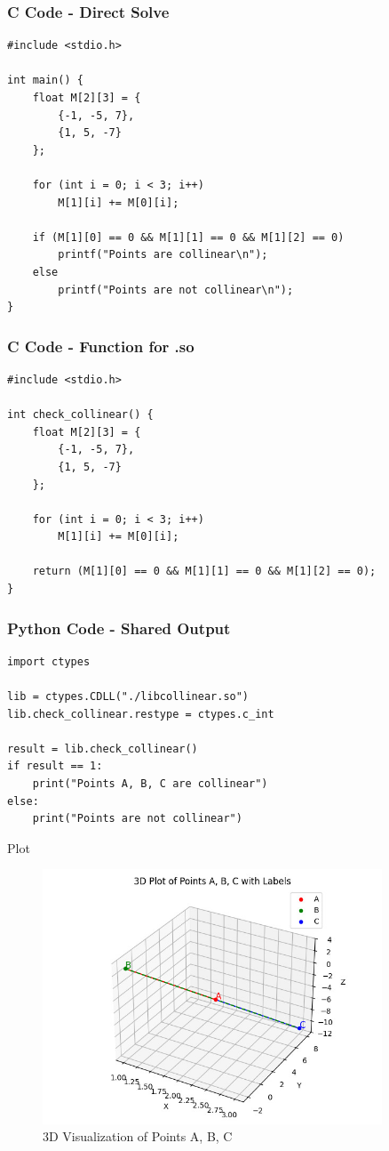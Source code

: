 \documentclass{beamer}
\begin{document}
\begin{frame}[fragile]
\frametitle{C Code - Direct Solve}
\begin{lstlisting}
#include <stdio.h>

int main() {
    float M[2][3] = {
        {-1, -5, 7},
        {1, 5, -7}
    };

    for (int i = 0; i < 3; i++)
        M[1][i] += M[0][i];

    if (M[1][0] == 0 && M[1][1] == 0 && M[1][2] == 0)
        printf("Points are collinear\n");
    else
        printf("Points are not collinear\n");
}
\end{lstlisting}
\end{frame}

\begin{frame}[fragile]
\frametitle{C Code - Function for .so}
\begin{lstlisting}
#include <stdio.h>

int check_collinear() {
    float M[2][3] = {
        {-1, -5, 7},
        {1, 5, -7}
    };

    for (int i = 0; i < 3; i++)
        M[1][i] += M[0][i];

    return (M[1][0] == 0 && M[1][1] == 0 && M[1][2] == 0);
}
\end{lstlisting}
\end{frame}

\begin{frame}[fragile]
\frametitle{Python Code - Shared Output}
\begin{lstlisting}
import ctypes

lib = ctypes.CDLL("./libcollinear.so")
lib.check_collinear.restype = ctypes.c_int

result = lib.check_collinear()
if result == 1:
    print("Points A, B, C are collinear")
else:
    print("Points are not collinear")
\end{lstlisting}
\end{frame}

\begin{frame}{Plot}
\begin{figure}
    \centering
    \includegraphics[width=0.9\textwidth]{figs/fig1.png}
    \caption{3D Visualization of Points A, B, C}
\end{figure}
\end{frame}
\end{document}

